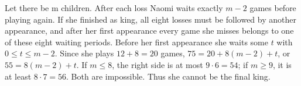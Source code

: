 Let there be m children. After each loss Naomi waits exactly $m-2$ games before playing again. If she finished as king, all eight losses must be followed by another appearance, and after her first appearance every game she misses belongs to one of these eight waiting periods. Before her first appearance she waits some $t$ with $0\le t\le m-2$. Since she plays $12+8=20$ games, $75=20+8(m-2)+t$, or $55=8(m-2)+t$. If $m\le8$, the right side is at most $9\cdot6=54$; if $m\ge9$, it is at least $8\cdot7=56$. Both are impossible. Thus she cannot be the final king.
